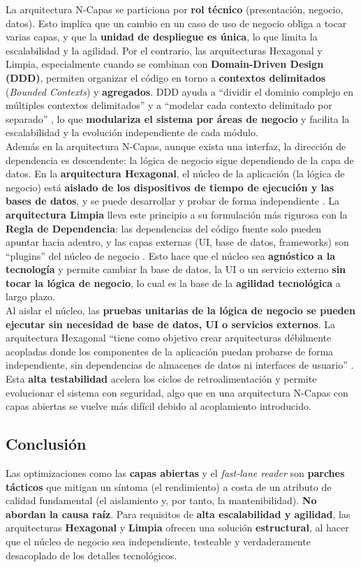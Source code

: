 \documentclass[12pt,a4paper]{article}
\begin{document}
La arquitectura N-Capas se particiona por \textbf{rol técnico} (presentación, negocio, datos). Esto implica que un cambio en un caso de uso de negocio obliga a tocar varias capas, y que la \textbf{unidad de despliegue es única}, lo que limita la escalabilidad y la agilidad. Por el contrario, las arquitecturas Hexagonal y Limpia, especialmente cuando se combinan con \textbf{Domain-Driven Design (DDD)}, permiten organizar el código en torno a \textbf{contextos delimitados} (\textit{Bounded Contexts}) y \textbf{agregados}. DDD ayuda a ``dividir el dominio complejo en múltiples contextos delimitados'' y a ``modelar cada contexto delimitado por separado'' \citep{evans2003}, lo que \textbf{modulariza el sistema por áreas de negocio} y facilita la escalabilidad y la evolución independiente de cada módulo.\\
Además en la arquitectura N-Capas, aunque exista una interfaz, la dirección de dependencia es descendente: la lógica de negocio sigue dependiendo de la capa de datos. En la \textbf{arquitectura Hexagonal}, el núcleo de la aplicación (la lógica de negocio) está \textbf{aislado de los dispositivos de tiempo de ejecución y las bases de datos}, y se puede desarrollar y probar de forma independiente \citep{cockburn2005}. La \textbf{arquitectura Limpia} lleva este principio a su formulación más rigurosa con la \textbf{Regla de Dependencia}: las dependencias del código fuente solo pueden apuntar hacia adentro, y las capas externas (UI, base de datos, frameworks) son ``plugins'' del núcleo de negocio \citep{martin2017}. Esto hace que el núcleo sea \textbf{agnóstico a la tecnología} y permite cambiar la base de datos, la UI o un servicio externo \textbf{sin tocar la lógica de negocio}, lo cual es la base de la \textbf{agilidad tecnológica} a largo plazo.\\
Al aislar el núcleo, las \textbf{pruebas unitarias de la lógica de negocio se pueden ejecutar sin necesidad de base de datos, UI o servicios externos}. La arquitectura Hexagonal ``tiene como objetivo crear arquitecturas débilmente acopladas donde los componentes de la aplicación puedan probarse de forma independiente, sin dependencias de almacenes de datos ni interfaces de usuario'' \citep{cockburn2005}. Esta \textbf{alta testabilidad} acelera los ciclos de retroalimentación y permite evolucionar el sistema con seguridad, algo que en una arquitectura N-Capas con capas abiertas se vuelve más difícil debido al acoplamiento introducido.

\subsection{Conclusión}
Las optimizaciones como las \textbf{capas abiertas} y el \textit{fast-lane reader} son \textbf{parches tácticos} que mitigan un síntoma (el rendimiento) a costa de un atributo de calidad fundamental (el aislamiento y, por tanto, la mantenibilidad). \textbf{No abordan la causa raíz}. Para requisitos de \textbf{alta escalabilidad y agilidad}, las arquitecturas \textbf{Hexagonal} y \textbf{Limpia} ofrecen una solución \textbf{estructural}, al hacer que el núcleo de negocio sea independiente, testeable y verdaderamente desacoplado de los detalles tecnológicos.
\end{document}

